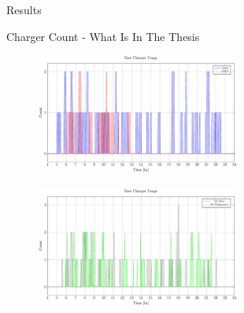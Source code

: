\documentclass[aspectratio=169]{beamer}
\begin{document}
\begin{frame}[label={sec:org4ee59dd}]{Results}
\begin{frame}[label={sec:org834c67f}]{Charger Count - What Is In The Thesis}
\begin{figure}[htpb]
\centering
    \includegraphics[width=0.6\textwidth]{img/sa-pap-paper-bad/charger-count-fast-milp-qin}
\end{figure}
\begin{figure}[htpb]
\centering
    \includegraphics[width=0.6\textwidth]{img/sa-pap-paper-bad/charger-count-fast-sa}
\end{figure}
\end{frame}


\end{frame}
\end{document}
